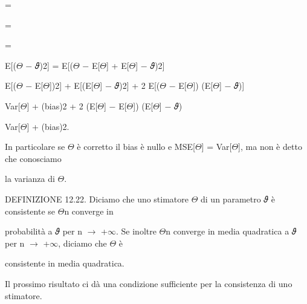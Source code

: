\documentclass[a4paper,portrait,12pt]{article}
\begin{document}
=


=


=





\begin{flushleft}
E[($\Theta$ $-$ 𝜗)2] = E[($\Theta$ $-$ E[$\Theta$] + E[$\Theta$] $-$ 𝜗)2]
\end{flushleft}


\begin{flushleft}
E[($\Theta$ $-$ E[$\Theta$])2] + E[(E[$\Theta$] $-$ 𝜗)2] + 2 E[($\Theta$ $-$ E[$\Theta$]) (E[$\Theta$] $-$ 𝜗)]
\end{flushleft}


\begin{flushleft}
Var[$\Theta$] + (bias)2 + 2 (E[$\Theta$] $-$ E[$\Theta$]) (E[$\Theta$] $-$ 𝜗)
\end{flushleft}


\begin{flushleft}
Var[$\Theta$] + (bias)2.
\end{flushleft}





\begin{flushleft}
In particolare se $\Theta$ \`{e} corretto il bias \`{e} nullo e MSE[$\Theta$] = Var[$\Theta$], ma non \`{e} detto che conosciamo
\end{flushleft}


\begin{flushleft}
la varianza di $\Theta$.
\end{flushleft}


\begin{flushleft}
DEFINIZIONE 12.22. Diciamo che uno stimatore $\Theta$ di un parametro 𝜗 \`{e} consistente se $\Theta$n converge in
\end{flushleft}


\begin{flushleft}
probabilit\`{a} a 𝜗 per n $\rightarrow$ +$\infty$. Se inoltre $\Theta$n converge in media quadratica a 𝜗 per n $\rightarrow$ +$\infty$, diciamo che $\Theta$ \`{e}
\end{flushleft}


\begin{flushleft}
consistente in media quadratica.
\end{flushleft}


\begin{flushleft}
Il prossimo risultato ci d\`{a} una condizione sufficiente per la consistenza di uno stimatore.
\end{flushleft}
\end{document}
